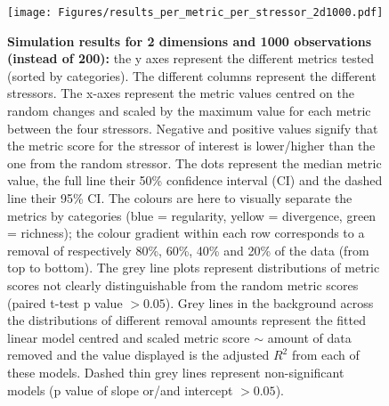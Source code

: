 \documentclass[12pt,letterpaper]{article}
\begin{document}
\begin{figure}[!htbp]
\centering
   \texttt{[image: Figures/results\_per\_metric\_per\_stressor\_2d1000.pdf]}
\caption{\scriptsize{\textbf{Simulation results for 2 dimensions and 1000 observations (instead of 200):} the y axes represent the different metrics tested (sorted by categories).
The different columns represent the different stressors. The x-axes represent the metric values centred on the random changes and scaled by the maximum value for each metric between the four stressors.
Negative and positive values signify that the metric score for the stressor of interest is lower/higher than the one from the random stressor.
The dots represent the median metric value, the full line their 50\% confidence interval (CI) and the dashed line their 95\% CI.
The colours are here to visually separate the metrics by categories (blue = regularity, yellow = divergence, green = richness); the colour gradient within each row corresponds to a removal of respectively 80\%, 60\%, 40\% and 20\% of the data (from top to bottom).
The grey line plots represent distributions of metric scores not clearly distinguishable from the random metric scores (paired t-test p value $> 0.05$).
Grey lines in the background across the distributions of different removal amounts represent the fitted linear model centred and scaled metric score $\sim$ amount of data removed and the value displayed is the adjusted $R^2$ from each of these models.
Dashed thin grey lines represent non-significant models (p value of slope or/and intercept $> 0.05$).
}}
\label{Fig:simulation_results_2d1000}
\end{figure}
\bigskip
\end{document}
